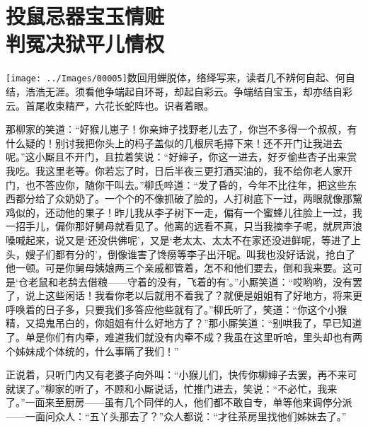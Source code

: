

\chapter{投鼠忌器宝玉情赃\\判冤决狱平儿情权}

{\texttt{[image: ../Images/00005]}数回用蝉脱体，络绎写来，读者几不辨何自起、何自结，浩浩无涯。须看他争端起自环哥，却起自彩云。争端结自宝玉，却亦结自彩云。首尾收束精严，六花长蛇阵也。识者着眼。}

那柳家的笑道：``好猴儿崽子！你亲婶子找野老儿去了，你岂不多得一个叔叔，有什么疑的！别讨我把你头上的杩子盖似的几根屄毛撏下来！还不开门让我进去呢。''这小厮且不开门，且拉着笑说：``好婶子，你这一进去，好歹偷些杏子出来赏我吃。我这里老等。你若忘了时，日后半夜三更打酒买油的，我不给你老人家开门，也不答应你，随你干叫去。''柳氏啐道：``发了昏的，今年不比往年，把这些东西都分给了众奶奶了。一个个的不像抓破了脸的，人打树底下一过，两眼就像那黧鸡似的，还动他的果子！昨儿我从李子树下一走，偏有一个蜜蜂儿往脸上一过，我一招手儿，偏你那好舅母就看见了。他离的远看不真，只当我摘李子呢，就屄声浪嗓喊起来，说又是`还没供佛呢'，又是`老太太、太太不在家还没进鲜呢，等进了上头，嫂子们都有分的'，倒像谁害了馋痨等李子出汗呢。叫我也没好话说，抢白了他一顿。可是你舅母姨娘两三个亲戚都管着，怎不和他们要去，倒和我来要。这可是`仓老鼠和老鸹去借粮------守着的没有，飞着的有'。''小厮笑道：``哎哟哟，没有罢了，说上这些闲话！我看你老以后就用不着我了？就便是姐姐有了好地方，将来更呼唤着的日子多，只要我们多答应他些就有了。''柳氏听了，笑道：``你这个小猴精，又捣鬼吊白的，你姐姐有什么好地方了？''那小厮笑道：``别哄我了，早已知道了。单是你们有内牵，难道我们就没有内牵不成？我虽在这里听哈，里头却也有两个姊妹成个体统的，什么事瞒了我们！''

正说着，只听门内又有老婆子向外叫：``小猴儿们，快传你柳婶子去罢，再不来可就误了。''柳家的听了，不顾和小厮说话，忙推门进去，笑说：``不必忙，我来了。''一面来至厨房------虽有几个同伴的人，他们都不敢自专，单等他来调停分派------一面问众人：``五丫头那去了？''众人都说：``才往茶房里找他们姊妹去了。''

